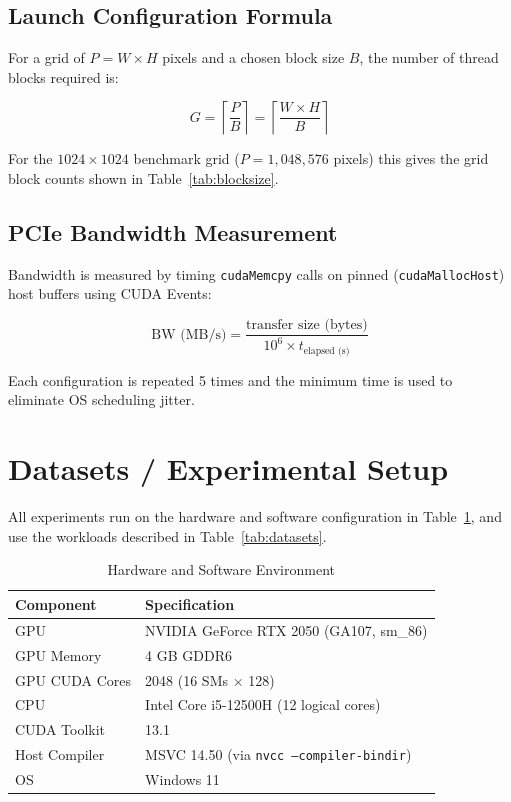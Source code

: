 \documentclass[12pt,a4paper]{article}
\begin{document}
\subsection{Launch Configuration Formula}

For a grid of $P = W \times H$ pixels and a chosen block size $B$, the
number of thread blocks required is:

\begin{equation}
    G = \left\lceil \frac{P}{B} \right\rceil = \left\lceil \frac{W \times H}{B} \right\rceil
    \label{eq:gridblocks}
\end{equation}

For the $1024 \times 1024$ benchmark grid ($P = 1{,}048{,}576$ pixels) this
gives the grid block counts shown in Table~\ref{tab:blocksize}.

\subsection{PCIe Bandwidth Measurement}

Bandwidth is measured by timing \texttt{cudaMemcpy} calls on pinned
(\texttt{cudaMallocHost}) host buffers using CUDA Events:

\begin{equation}
    \text{BW (MB/s)} = \frac{\text{transfer size (bytes)}}{10^6 \times t_\text{elapsed (s)}}
    \label{eq:bw}
\end{equation}

Each configuration is repeated 5 times and the minimum time is used to
eliminate OS scheduling jitter.

\newpage
\section{Datasets / Experimental Setup}

All experiments run on the hardware and software configuration in
Table~\ref{tab:hw}, and use the workloads described in Table~\ref{tab:datasets}.

\begin{table}[h!]
\centering
\caption{Hardware and Software Environment}
\label{tab:hw}
\begin{tabular}{ll}
\toprule
\textbf{Component} & \textbf{Specification} \\
\midrule
GPU & NVIDIA GeForce RTX 2050 (GA107, sm\_86) \\
GPU Memory & 4 GB GDDR6 \\
GPU CUDA Cores & 2048 (16 SMs $\times$ 128) \\
CPU & Intel Core i5-12500H (12 logical cores) \\
CUDA Toolkit & 13.1 \\
Host Compiler & MSVC 14.50 (via \texttt{nvcc --compiler-bindir}) \\
OS & Windows 11 \\
\bottomrule
\end{tabular}
\end{table}
\end{document}
